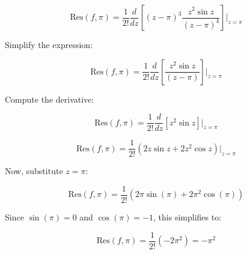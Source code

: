 \documentclass[journal,12pt,twocolumn]{IEEEtran}
\theoremstyle{remark}
\begin{document}
\begin{equation}
\text{Res}(f,\pi) = \frac{1}{2!} \frac{d}{dz} \left[ (z-\pi)^3 \frac{z^2 \sin z}{(z-\pi)^4} \right] \Bigg|_{z=\pi}
\end{equation}

Simplify the expression:

\begin{equation}
\text{Res}(f,\pi) = \frac{1}{2!} \frac{d}{dz} \left[ \frac{z^2 \sin z}{(z-\pi)} \right] \Bigg|_{z=\pi}
\end{equation}

Compute the derivative:

\begin{equation}
\text{Res}(f,\pi) = \frac{1}{2!} \frac{d}{dz} \left[ z^2 \sin z \right] \Bigg|_{z=\pi}
\end{equation}

\begin{equation}
\text{Res}(f,\pi) = \frac{1}{2!} \left( 2z \sin z + 2z^2 \cos z \right) \Bigg|_{z=\pi}
\end{equation}

Now, substitute \( z=\pi \):

\begin{equation}
\text{Res}(f,\pi) = \frac{1}{2!} \left( 2\pi \sin(\pi) + 2\pi^2 \cos(\pi) \right)
\end{equation}

Since \( \sin(\pi) = 0 \) and \( \cos(\pi) = -1 \), this simplifies to:

\begin{equation}
\text{Res}(f,\pi) = \frac{1}{2!} (-2\pi^2) = -\pi^2
\end{equation}
\end{document}
